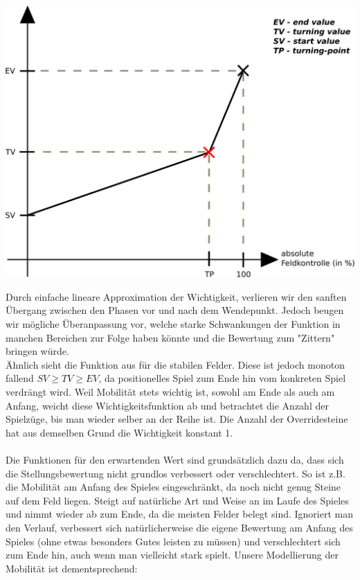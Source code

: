 \begin{center}
\includegraphics[scale=0.15]{ImportanceFunctionGraph.pdf}
\end{center}
Durch einfache lineare Approximation der Wichtigkeit, verlieren wir den sanften Übergang zwischen den Phasen vor und nach dem Wendepunkt. Jedoch beugen wir mögliche Überanpassung vor, welche starke Schwankungen der Funktion in manchen Bereichen zur Folge haben könnte und die Bewertung zum "Zittern" bringen würde.\\
Ähnlich sieht die Funktion aus für die stabilen Felder. Diese ist jedoch monoton fallend $SV \geq TV \geq EV$, da positionelles Spiel zum Ende hin vom konkreten Spiel verdrängt wird. Weil Mobilität stets wichtig ist, sowohl am Ende als auch am Anfang, weicht diese Wichtigkeitsfunktion ab und betrachtet die Anzahl der Spielzüge, bis man wieder selber an der Reihe ist. Die Anzahl der Overridesteine hat aus demselben Grund die Wichtigkeit konstant 1.\\\\
Die Funktionen für den erwartenden Wert sind grundsätzlich dazu da, dass sich die Stellungsbewertung nicht grundlos verbessert oder verschlechtert. So ist z.B. die Mobilität am Anfang des Spieles eingeschränkt, da noch nicht genug Steine auf dem Feld liegen. Steigt auf natürliche Art und Weise an im Laufe des Spieles und nimmt wieder ab zum Ende, da die meisten Felder belegt sind. Ignoriert man den Verlauf, verbessert sich natürlicherweise die eigene Bewertung am Anfang des Spieles (ohne etwas besonders Gutes leisten zu müssen) und verschlechtert sich zum Ende hin, auch wenn man vielleicht stark spielt. Unsere Modellierung der Mobilität ist dementsprechend:
